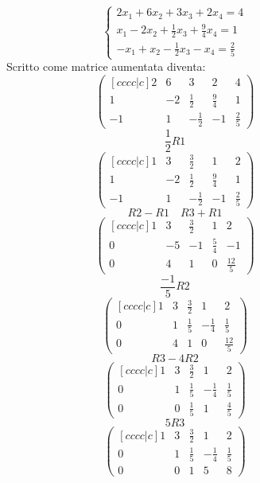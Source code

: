\documentclass[a4paper]{article}
\theoremstyle{break}
\theoremstyle{break}
\theoremstyle{break}
\theoremstyle{break}
\begin{document}
\begin{figure}[H]
	\begin{example}
		\[
			\begin{cases}
				2x_1 + 6x_2 + 3x_3 + 2x_4 = 4                    \\
				x_1 - 2x_2 + \frac{1}{2}x_3 + \frac{9}{4}x_4 = 1 \\
				-x_1 + x_2 - \frac{1}{2}x_3 - x_4 = \frac{2}{5}
			\end{cases}
		\]
		Scritto come matrice aumentata diventa:
		\[
			\begin{pmatrix}[cccc|c]
				2  & 6  & 3            & 2           & 4           \\
				1  & -2 & \frac{1}{2}  & \frac{9}{4} & 1           \\
				-1 & 1  & -\frac{1}{2} & -1          & \frac{2}{5}
			\end{pmatrix}
		\]
		\[
			\frac{1}{2}R1
		\]
		\[
      \begin{pmatrix}[cccc|c]
        1  & 3  & \frac{3}{2}  & 1 & 2            \\
        1  & -2 & \frac{1}{2}  & \frac{9}{4} & 1  \\
        -1 & 1  & -\frac{1}{2} & -1 & \frac{2}{5}
			\end{pmatrix}
		\]
		\[
			R2 - R1 \quad R3 + R1
		\]
		\[
      \begin{pmatrix}[cccc|c]
        1 & 3  & \frac{3}{2} & 1 & 2            \\
        0 & -5 & -1          & \frac{5}{4} & -1 \\
        0 & 4  & 1           & 0 & \frac{12}{5}
			\end{pmatrix}
		\]
		\[
			\frac{-1}{5}R2
		\]
		\[
			\begin{pmatrix}[cccc|c]
				1 & 3 & \frac{3}{2} & 1            & 2            \\
				0 & 1 & \frac{1}{5} & -\frac{1}{4} & \frac{1}{5}  \\
				0 & 4 & 1           & 0            & \frac{12}{5}
			\end{pmatrix}
		\]
		\[
			R3 - 4R2
		\]
		\[
			\begin{pmatrix}[cccc|c]
				1 & 3 & \frac{3}{2} & 1            & 2           \\
				0 & 1 & \frac{1}{5} & -\frac{1}{4} & \frac{1}{5} \\
				0 & 0 & \frac{1}{5} & 1            & \frac{4}{5}
			\end{pmatrix}
		\]
		\[
			5R3
		\]
		\[
			\begin{pmatrix}[cccc|c]
				1 & 3 & \frac{3}{2} & 1            & 2           \\
				0 & 1 & \frac{1}{5} & -\frac{1}{4} & \frac{1}{5} \\
				0 & 0 & 1           & 5            & 8
			\end{pmatrix}
		\]
	\end{example}
\end{figure}
\end{document}
